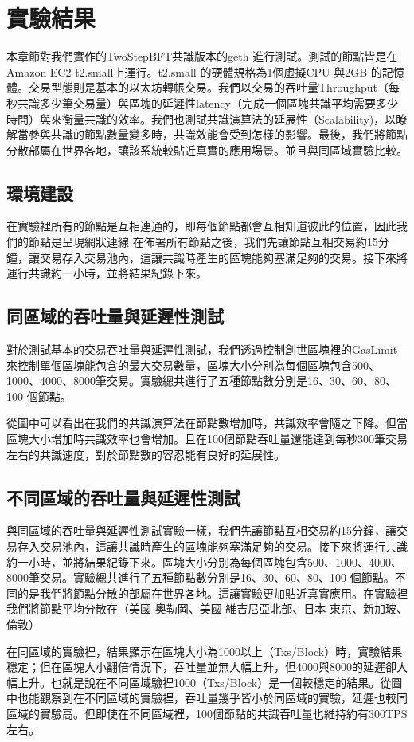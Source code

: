 \chapter{實驗結果} \label{se_6}
本章節對我們實作的TwoStepBFT共識版本的geth 進行測試。測試的節點皆是在Amazon EC2 t2.small上運行。t2.small 的硬體規格為1個虛擬CPU 與2GB 的記憶體。交易型態則是基本的以太坊轉帳交易。我們以交易的吞吐量Throughput（每秒共識多少筆交易量）與區塊的延遲性latency（完成一個區塊共識平均需要多少時間）與來衡量共識的效率。我們也測試共識演算法的延展性（Scalability)，以瞭解當參與共識的節點數量變多時，共識效能會受到怎樣的影響。最後，我們將節點分散部屬在世界各地，讓該系統較貼近真實的應用場景。並且與同區域實驗比較。
\section{環境建設}\label{se_6}
在實驗裡所有的節點是互相連通的，即每個節點都會互相知道彼此的位置，因此我們的節點是呈現網狀連線
在佈署所有節點之後，我們先讓節點互相交易約15分鐘，讓交易存入交易池內，這讓共識時產生的區塊能夠塞滿足夠的交易。接下來將運行共識約一小時，並將結果紀錄下來。
\section{同區域的吞吐量與延遲性測試}\label{se_6}
對於測試基本的交易吞吐量與延遲性測試，我們透過控制創世區塊裡的GasLimit來控制單個區塊能包含的最大交易數量，區塊大小分別為每個區塊包含500、1000、4000、8000筆交易。實驗總共進行了五種節點數分別是16、30、60、80、100 個節點。
 
\newpage


從圖中可以看出在我們的共識演算法在節點數增加時，共識效率會隨之下降。但當區塊大小增加時共識效率也會增加。且在100個節點吞吐量還能達到每秒300筆交易左右的共識速度，對於節點數的容忍能有良好的延展性。



\section{不同區域的吞吐量與延遲性測試}\label{se_6}
與同區域的吞吐量與延遲性測試實驗一樣，我們先讓節點互相交易約15分鐘，讓交易存入交易池內，這讓共識時產生的區塊能夠塞滿足夠的交易。接下來將運行共識約一小時，並將結果紀錄下來。區塊大小分別為每個區塊包含500、1000、4000、8000筆交易。實驗總共進行了五種節點數分別是16、30、60、80、100 個節點。不同的是我們將節點分散的部屬在世界各地。這讓實驗更加貼近真實應用。在實驗裡我們將節點平均分散在（美國-奧勒岡、美國-維吉尼亞北部、日本-東京、新加玻、倫敦）



在同區域的實驗裡，結果顯示在區塊大小為1000以上（Txs/Block）時，實驗結果穩定；但在區塊大小翻倍情況下，吞吐量並無大幅上升，但4000與8000的延遲卻大幅上升。也就是說在不同區域驗裡1000（Txs/Block）是一個較穩定的結果。從圖中也能觀察到在不同區域的實驗裡，吞吐量幾乎皆小於同區域的實驗，延遲也較同區域的實驗高。但即使在不同區域裡，100個節點的共識吞吐量也維持約有300TPS左右。
%
